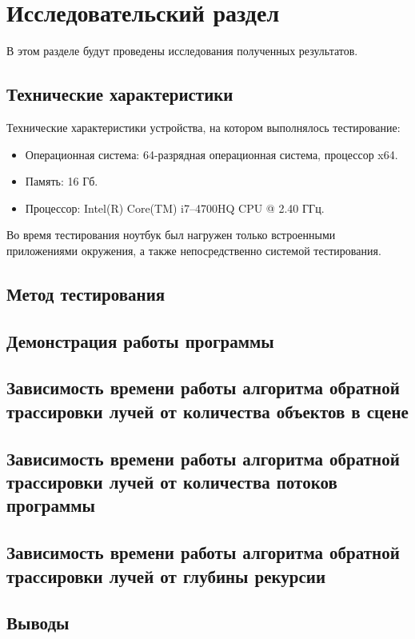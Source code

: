 \chapter{Исследовательский раздел}
В этом разделе будут проведены исследования полученных результатов.
\section{Технические характеристики}
Технические характеристики устройства, на котором выполнялось тестирование:

\begin{itemize}
	\item Операционная система: 64-разрядная операционная система, процессор x64.
	\item Память: 16 Гб.
	\item Процессор: Intel(R) Core(TM) i7--4700HQ CPU @ 2.40 ГГц.
\end{itemize}

Во время тестирования ноутбук был нагружен только встроенными приложениями окружения, а также непосредственно системой тестирования.
\section{Метод тестирования}
\section{Демонстрация работы программы}
\section{Зависимость времени работы алгоритма обратной трассировки лучей от количества объектов в сцене}
\section{Зависимость времени работы алгоритма обратной трассировки лучей от количества потоков программы}
\section{Зависимость времени работы алгоритма обратной трассировки лучей от глубины рекурсии}
\section{Выводы}